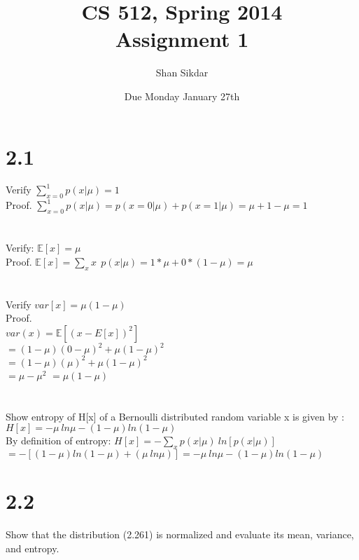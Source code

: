 \documentclass[11pt,leqno,fleqn]{article}
\title{CS 512, Spring 2014
       \\[1ex]
       \textbf{Assignment 1}}
\author{Shan Sikdar}
\date{Due Monday January 27th} %
\begin{document}
\maketitle

\section{ 2.1 }
Verify $ \sum\limits_{x=0}^1 p(x | \mu) =1 $ \\
Proof.  $  \sum\limits_{x=0}^1 p(x | \mu) = p( x = 0 | \mu) + p( x= 1 | \mu) =  \mu + 1 - \mu = 1 $\\
\\
\\
Verify: $\mathbb{E}[x] = \mu$\\
Proof.   $\mathbb{E}[x] =  \sum\limits_{x} x \ \  p(x | \mu)  = 1* \mu + 0*(1 - \mu) = \mu$\\
\\
\\
Verify $var[x] = \mu (1 - \mu) $\\
Proof.  \\
$var(x) = \mathbb{E}[(x - E[x])^2]$\\
$= (1 - \mu )(0 - \mu)^2  + \mu (1 - \mu)^2$\\
$= (1 - \mu )(\mu)^2  + \mu (1 - \mu)^2$\\
$ = \mu - \mu^2 $ $ = \mu(1-\mu)$\\
\\
\\
Show entropy of H[x] of a Bernoulli distributed random variable x is given by : $H[x] = - \mu \  ln \mu - ( 1- \mu) ln(1-\mu)$\\
By definition of entropy: $ H[x] = - \sum\limits_{x} p(x | \mu)  \ ln[p(x | \mu)]  $\\
$= -[ (1 - \mu) ln(1-\mu) + (\mu \ ln \mu)]  =  - \mu \  ln \mu - ( 1- \mu) ln(1-\mu)$

\section{ 2.2} Show that the distribution (2.261) is normalized and evaluate its mean, variance, and entropy.\\
 
\end{document}

